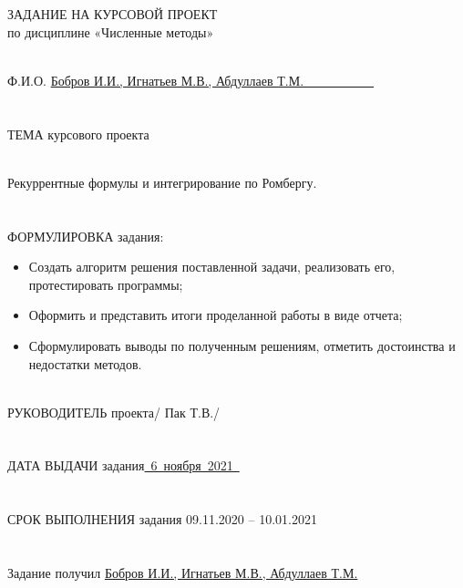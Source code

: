 \documentclass[14pt, titlepage, a4paper]{extarticle} %
\begin{document}
	
	
	\begin{center}
		ЗАДАНИЕ НА КУРСОВОЙ ПРОЕКТ\\
		по дисциплине «Численные методы»
	\end{center}
	
	~\\	
	Ф.И.О. \uline{\vspace{10pt} Бобров И.И., Игнатьев М.В., Абдуллаев Т.М.~~~~~~~~~~~}\\
	~\\
	~\\
	ТЕМА курсового проекта
	
	~\\
	Рекуррентные формулы и интегрирование по Ромбергу.
	\\
	~\\
	~\\
	ФОРМУЛИРОВКА  задания:
	
	\begin{itemize}
		\item Создать алгоритм решения поставленной задачи, реализовать его, протестировать программы;
		\item Оформить и представить итоги проделанной работы в виде отчета;
		\item Сформулировать выводы по полученным решениям, отметить достоинства и недостатки методов.
	\end{itemize}

	~\\
	РУКОВОДИТЕЛЬ проекта\uline{\hspace{80pt}}/ Пак Т.В./\\	
	\\
	~\\
	ДАТА ВЫДАЧИ задания\uline{~6~ноября~2021~}\\
	\\
	~\\
	СРОК ВЫПОЛНЕНИЯ задания 09.11.2020 – 10.01.2021\\
	\\
	~\\
	Задание получил \uline{Бобров И.И., Игнатьев М.В., Абдуллаев Т.М.}\\
	
	\thispagestyle{empty}
	\newpage
	
	

\end{document}
